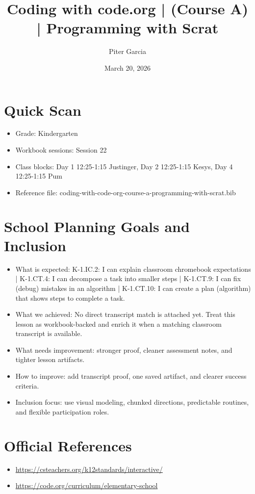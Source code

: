 \documentclass[11pt]{article}
\title{Coding with code.org | (Course A) | Programming with Scrat}
\author{Piter Garcia}
\date{March 20, 2026}
\begin{document}
    \maketitle
    \section*{Quick Scan}
    \begin{itemize}[leftmargin=*]
    \item Grade: Kindergarten
    \item Workbook sessions: Session 22
    \item Class blocks: Day 1 12:25-1:15 Justinger, Day 2 12:25-1:15 Kesys, Day 4 12:25-1:15 Pum
    \item Reference file: coding-with-code-org-course-a-programming-with-scrat.bib
    \end{itemize}
    \section*{School Planning Goals and Inclusion}
    \begin{itemize}[leftmargin=*]
    \item What is expected: K-1.IC.2: I can explain classroom chromebook expectations | K-1.CT.4: I can decompose a task into smaller steps | K-1.CT.9: I can fix (debug) mistakes in an algorithm | K-1.CT.10: I can create a plan (algorithm) that shows steps to complete a task.
    \item What we achieved: No direct transcript match is attached yet. Treat this lesson as workbook-backed and enrich it when a matching classroom transcript is available.
    \item What needs improvement: stronger proof, cleaner assessment notes, and tighter lesson artifacts.
    \item How to improve: add transcript proof, one saved artifact, and clearer success criteria.
    \item Inclusion focus: use visual modeling, chunked directions, predictable routines, and flexible participation roles.
    \end{itemize}
    \section*{Official References}
    \begin{itemize}[leftmargin=*]
    \item \url{https://csteachers.org/k12standards/interactive/}
\item \url{https://code.org/curriculum/elementary-school}

    \end{itemize}
    
\end{document}
